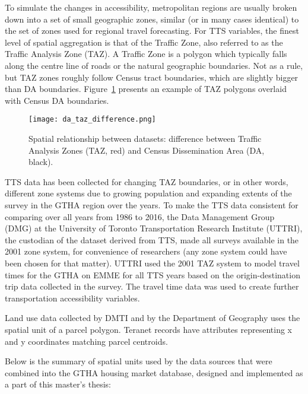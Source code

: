 To simulate the changes in accessibility, metropolitan regions are usually broken down into a set of small geographic zones, similar (or in many cases identical) to the set of zones used for regional travel forecasting.
For TTS variables, the finest level of spatial aggregation is that of the Traffic Zone, also referred to as the Traffic Analysis Zone (TAZ).
A Traffic Zone is a polygon which typically falls along the centre line of roads or the natural geographic boundaries\cite{DataManagementGroup2019}.
Not as a rule, but TAZ zones roughly follow Census tract boundaries, which are slightly bigger than DA boundaries.
Figure~\ref{fig:da_taz_difference} presents an example of TAZ polygons overlaid with Census DA boundaries.

\begin{figure}[hbt!]
    \centering
    \texttt{[image: da\_taz\_difference.png]}
    \caption{Spatial relationship between datasets: difference between Traffic Analysis Zones (TAZ, red) and Census Dissemination Area (DA, black).}
    \label{fig:da_taz_difference}
\end{figure}

TTS data has been collected for changing TAZ boundaries, or in other words, different zone systems due to growing population and expanding extents of the survey in the GTHA region over the years.
To make the TTS data consistent for comparing over all years from 1986 to 2016, the Data Management Group (DMG) at the University of Toronto Transportation Research Institute (UTTRI), the custodian of the dataset derived from TTS, made all surveys available in the 2001 zone system, for convenience of researchers (any zone system could have been chosen for that matter).
UTTRI used the 2001 TAZ system to model travel times for the GTHA on EMME for all TTS years based on the origin-destination trip data collected in the survey.
The travel time data was used to create further transportation accessibility variables.

Land use data collected by DMTI and by the Department of Geography uses the spatial unit of a parcel polygon.
Teranet records have attributes representing x and y coordinates matching parcel centroids.

\vspace{5mm}

Below is the summary of spatial units used by the data sources that were combined into the GTHA housing market database, designed and implemented as a part of this master's thesis:

